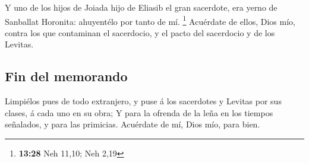  Y uno de los hijos de Joiada hijo de Eliasib el gran
sacerdote, era yerno de Sanballat Horonita: ahuyentélo por tanto de mí.
\footnote{\textbf{13:28} Neh 11,10; Neh 2,19}  Acuérdate de
ellos, Dios mío, contra los que contaminan el sacerdocio, y el pacto del
sacerdocio y de los Levitas.

\hypertarget{fin-del-memorando}{%
\subsection{Fin del memorando}\label{fin-del-memorando}}

 Limpiélos pues de todo extranjero, y puse á los sacerdotes
y Levitas por sus clases, á cada uno en su obra;  Y para la
ofrenda de la leña en los tiempos señalados, y para las primicias.
Acuérdate de mí, Dios mío, para bien.
